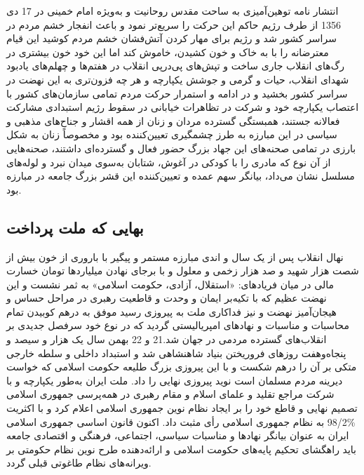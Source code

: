 \documentclass[12pt]{article}
\begin{document}
انتشار نامه توهین‌آمیزی به ساحت مقدس روحانیت و به‌ویژه‌ امام خمینی در 17 دی 1356 از طرف رژیم حاکم این حرکت را سریع‌تر نمود و باعث انفجار خشم مردم در سراسر کشور شد و رژیم برای مهار کردن آتش‌فشان خشم مردم کوشید این قیام معترضانه را با به خاک و خون کشیدن‌، خاموش کند اما این خود خون بیشتری در رگ‌های انقلاب جاری ساخت و تپش‌های پی‌درپی انقلاب در هفتم‌ها و چهلم‌های یادبود شهدای انقلاب‌، حیات و گرمی و جوشش یکپارچه و هر چه فزون‌تری به این نهضت در سراسر کشور بخشید و در ادامه و استمرار حرکت مردم تمامی سازمان‌های کشور با اعتصاب یکپارچه خود و شرکت در تظاهرات خیابانی در سقوط رژیم ‌استبدادی مشارکت فعالانه جستند، همبستگی گسترده مردان و زنان از همه اقشار و جناح‌های مذهبی و سیاسی در این مبارزه به طرز چشمگیری تعیین‌کننده بود و مخصوصاً زنان به شکل بارزی در تمامی صحنه‌های این جهاد بزرگ حضور فعال و گسترده‌ای داشتند، صحنه‌هایی از آن نوع که مادری را با کودکی در آغوش‌، شتابان به‌سوی میدان نبرد و لوله‌های مسلسل نشان می‌داد، بیانگر سهم عمده و تعیین‌کننده این قشر بزرگ جامعه در مبارزه بود.

\subsection*{بهایی که ملت پرداخت}
‌نهال انقلاب پس از یک سال و اندی مبارزه مستمر و پیگیر با باروری از خون بیش از شصت هزار شهید و صد هزار زخمی و معلول و با برجای نهادن میلیاردها تومان خسارت مالی در میان فریادهای: «استقلال‌، آزادی‌، حکومت اسلامی‌» به ثمر نشست و این نهضت عظیم که با تکیه‌بر ایمان و وحدت و قاطعیت رهبری در مراحل حساس و هیجان‌آمیز نهضت و نیز فداکاری ملت به پیروزی رسید موفق به درهم کوبیدن تمام محاسبات و مناسبات و نهادهای ‌امپریالیستی گردید که در نوع خود سرفصل جدیدی بر انقلاب‌های گسترده مردمی در جهان شد.21 و 22 بهمن سال یک هزار و سیصد و پنجاه‌وهفت روزهای فروریختن بنیاد شاهنشاهی شد و استبداد داخلی و سلطه خارجی ‌متکی بر آن را درهم شکست و با این پیروزی بزرگ طلیعه حکومت اسلامی که خواست دیرینه مردم مسلمان است نوید پیروزی نهایی را داد. ملت ایران به‌طور یکپارچه و با شرکت مراجع تقلید و علمای اسلام و مقام رهبری در همه‌پرسی جمهوری اسلامی تصمیم نهایی و قاطع خود را بر ایجاد نظام نوین جمهوری اسلامی اعلام کرد و با اکثریت 
\%98/2
به نظام جمهوری اسلامی رأی مثبت داد. اکنون قانون اساسی جمهوری اسلامی ایران به عنوان بیانگر نهادها و مناسبات سیاسی‌، اجتماعی‌، فرهنگی و اقتصادی جامعه باید راهگشای تحکیم پایه‌های حکومت اسلامی و ارائه‌دهنده طرح نوین نظام حکومتی بر ویرانه‌های نظام طاغوتی قبلی گردد.
 
 
\end{document}
